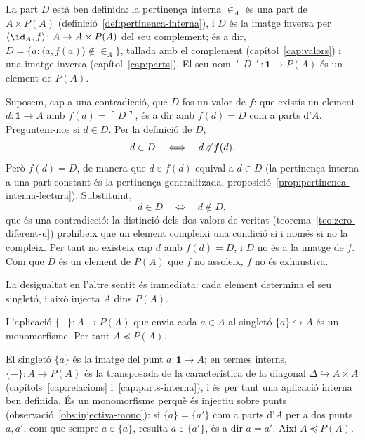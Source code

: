 \begin{prova}
La part \(D\) està ben definida: la pertinença interna \({\in_A}\) és una
part de \(A\times P(A)\) (definició~\ref{def:pertinenca-interna}), i \(D\) és
la imatge inversa per \(\langle\id_A,f\rangle\colon A\to A\times P(A)\) del
seu complement; és a dir, \(D=\{a : \langle a,f(a)\rangle\notin{\in_A}\}\),
tallada amb el complement (capítol~\ref{cap:valors}) i una imatge inversa
(capítol~\ref{cap:parts}). El seu nom
\(\ulcorner D\urcorner\colon\mathbf1\to P(A)\) és un element de \(P(A)\).

Suposem, cap a una contradicció, que \(D\) fos un valor de \(f\): que
existís un element \(d\colon\mathbf1\to A\) amb \(f(d)=\ulcorner
D\urcorner\), és a dir amb \(f(d)=D\) com a parts d'\(A\). Preguntem-nos si
\(d\in D\). Per la definició de \(D\),
\[
d\in D
\quad\Longleftrightarrow\quad
d\not\mathrel{\varepsilon} f(d).
\]
Però \(f(d)=D\), de manera que \(d\mathrel{\varepsilon} f(d)\) equival a
\(d\in D\) (la pertinença interna a una part constant és la pertinença
generalitzada, proposició~\ref{prop:pertinenca-interna-lectura}). Substituint,
\[
d\in D
\quad\Longleftrightarrow\quad
d\notin D,
\]
que és una contradicció: la distinció dels dos valors de veritat
(teorema~\ref{teo:zero-diferent-u}) prohibeix que un element compleixi una
condició si i només si no la compleix. Per tant no existeix cap \(d\) amb
\(f(d)=D\), i \(D\) no és a la imatge de \(f\). Com que \(D\) és un element
de \(P(A)\) que \(f\) no assoleix, \(f\) no és exhaustiva.
\end{prova}

La desigualtat en l'altre sentit és immediata: cada element determina el seu
singletó, i això injecta \(A\) dins \(P(A)\).

\begin{proposicio}\label{prop:singletons}
L'aplicació \(\{-\}\colon A\to P(A)\) que envia cada \(a\in A\) al singletó
\(\{a\}\hookrightarrow A\) és un monomorfisme. Per tant \(A\preceq P(A)\).
\end{proposicio}

\begin{prova}
El singletó \(\{a\}\) és la imatge del punt \(a\colon\mathbf1\to A\); en
termes interns, \(\{-\}\colon A\to P(A)\) és la transposada de la
característica de la diagonal \(\Delta\hookrightarrow A\times A\)
(capítols~\ref{cap:relacions} i~\ref{cap:parts-interna}), i és per tant una
aplicació interna ben definida. És un monomorfisme perquè és injectiu
sobre punts (observació~\ref{obs:injectiva-mono}): si \(\{a\}=\{a'\}\) com
a parts d'\(A\) per a dos punts \(a,a'\), com que sempre
\(a\mathrel{\varepsilon}\{a\}\), resulta \(a\mathrel{\varepsilon}\{a'\}\), és a
dir \(a=a'\). Així \(A\preceq P(A)\).
\end{prova}


